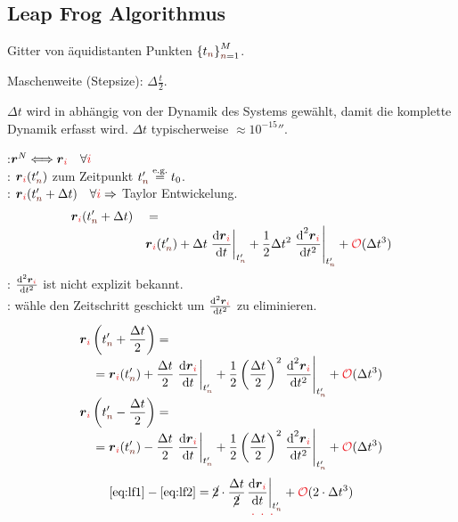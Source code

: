 \subsection{Leap Frog Algorithmus}
\label{subsec:LeapFrogAlgorithmus}
\begin{sectionbox}\nospacing
  \begin{numberlist}
    \item Gitter von äquidistanten Punkten $\left\{t_{\idxn}\right\}_{\idxn=1}^{M}$.
    \item Maschenweite (Stepsize): $\Delta \frac{t}{2}$.
    \item $\Delta t$ wird in abhängig von der Dynamik des Systems gewählt, damit die komplette Dynamik erfasst wird. $\Delta t$ typischerweise $\approx10^{-15}\second$.
  \end{numberlist}
  :\hfil$\rvec^N\hfil\Longleftrightarrow\hfil\rveci\quad\forall\idxi$\\
  : $\rveci(\tnp)$ zum Zeitpunkt $\tnp\eqs{\text{e.g.}}t_0$.\\
  : $\rveci(\tnp+\Delta t)\quad\forall\idxi\Rightarrow$ Taylor Entwickelung.
  \begin{alignat*}{3}
    &\rveci(\tnp+\Delta t)&&=\nalign
                            &&&\rveci(\tnp)+\Delta t\left.\difrac{\rveci}{t}\right\rvert_{\tnp}+\frac{1}{2}\Delta t^2\left.\frac{\diff^2\rveci}{\diff t^2}\right\rvert_{\tnp}+\bigO{\Delta t^3}
  \end{alignat*}
  : $\frac{\diff^2\rveci}{\diff t^2}$ ist nicht explizit bekannt.\\
  : wähle den Zeitschritt geschickt um $\frac{\diff^2\rveci}{\diff t^2}$ zu eliminieren.
  \begin{alignat}{2}
    &\rveci\left(\tnp+\frac{\Delta t}{2}\right)=\label{eq:lf1}\nalign
                            &\quad=\rveci(\tnp)+\frac{\Delta t}{2}\left.\difrac{\rveci}{t}\right\rvert_{\tnp}+\frac{1}{2}\left(\frac{\Delta t}{2}\right)^2\left.\frac{\diff^2\rveci}{\diff t^2}\right\rvert_{\tnp}+\bigO{\Delta t^3}\nonumber\nalign
    &\rveci\left(\tnp-\frac{\Delta t}{2}\right)=\label{eq:lf2}\nalign
                            &\quad=\rveci(\tnp)-\frac{\Delta t}{2}\left.\difrac{\rveci}{t}\right\rvert_{\tnp}+\frac{1}{2}\left(\frac{\Delta t}{2}\right)^2\left.\frac{\diff^2\rveci}{\diff t^2}\right\rvert_{\tnp}+\bigO{\Delta t^3}\nonumber
  \end{alignat}
  \begin{alignat*}{2}
    &\cref{eq:lf1}-\cref{eq:lf2}=\cancel{2}\cdot\frac{\Delta t}{\cancel{2}}\uldotted{\left.\difrac{\rveci}{t}\right\rvert_{\tnp}}+\bigO{2\cdot\Delta t^3}\nalign

\end{alignat*}
\end{sectionbox}
